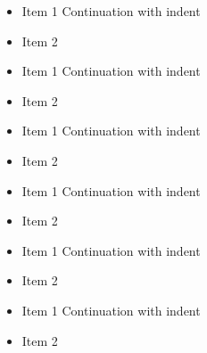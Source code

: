 \begin{itemize}
\item Item 1
Continuation with indent
\item Item 2
\end{itemize}
\begin{itemize}
\item Item 1
Continuation with indent
\item Item 2
\end{itemize}
\begin{itemize}
\item Item 1
Continuation with indent
\item Item 2
\end{itemize}
\begin{frame}[t]
\begin{itemize}
\item Item 1
Continuation with indent
\item Item 2
\end{itemize}
\end{frame}

\begin{frame}[t]
\begin{itemize}
\item Item 1
Continuation with indent
\item Item 2
\end{itemize}
\end{frame}

\begin{frame}[t]
\begin{itemize}
\item Item 1
Continuation with indent
\item Item 2
\end{itemize}
\end{frame}

